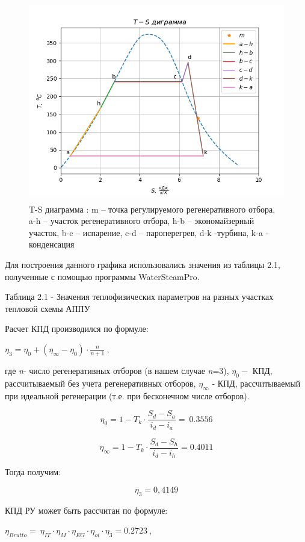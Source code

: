 \begin{figure}[!h]
\center
\includegraphics[width=4.56942in,height=3.48958in]{media/image5.png}
\caption{T-S диаграмма : m -- точка регулируемого регенеративного отбора,
a-h -- участок регенеративного отбора, h-b -- экономайзерный участок,
b-c -- испарение, c-d -- пароперегрев, d-k -турбина, k-a - конденсация}
\end{figure}

Для построения данного графика использовались значения из таблицы 2.1,
полученные с помощью программы WaterSteamPro.

Таблица 2.1 - Значения теплофизических параметров на разных участках
тепловой схемы АППУ

Расчет КПД производился по формуле:

\(\eta_{3} = \eta_{0} + \left( \eta_{\infty} - \eta_{0} \right) \cdot \frac{n}{n + 1}\ ,\)

где \emph{n}- число регенеративных отборов (в нашем случае \emph{n}=3),
\(\eta_{0} -\) КПД, рассчитываемый без учета регенеративных отборов,
$\eta_\infty$ - КПД, рассчитываемый при идеальной
 регенерации (т.е. при бесконечном числе отборов).

\[\eta_{0} = 1 - T_{k} \cdot \frac{S_{d} - S_{a}}{i_{d} - i_{a}} = \ 0.3556\]

\[\eta_{\infty} = 1 - T_{k} \cdot \frac{S_{d} - S_{h}}{i_{d} - i_{h}} = 0.4011\]

Тогда получим:

\[\eta_{3} = 0,4149\]

КПД РУ может быть рассчитан по формуле:

\(\eta_{Brutto} = \ \eta_{IT} \cdot \eta_{M} \cdot \eta_{EG} \cdot \eta_{oi} \cdot \eta_{3} = 0.2723\ \),

